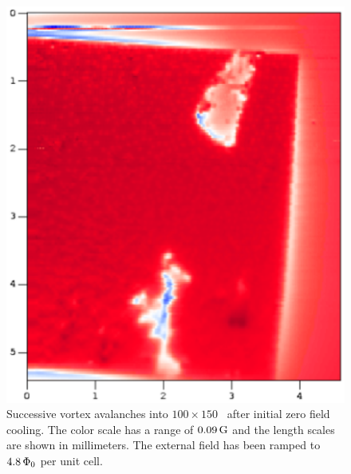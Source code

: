 \begin{figure}[p]
\includegraphics[width=5.7in]{figs/prospective/fig1_b_lg.ps}
\caption[Successive vortex avalanches in to \jja, 
the external field has been ramped to $4.8\,\Phinot$ per unit cell.]
{Successive vortex avalanches into $100\times 150$ \jja\ after initial
zero field cooling. The color scale has a range of
$0.09\,\mathrm{G}$ and the length scales are shown in 
millimeters.
The external field has been ramped to $4.8\,\Phinot$ per unit cell.
}
\label{fig:initial_vortex_avalanche_b}
\end{figure}

